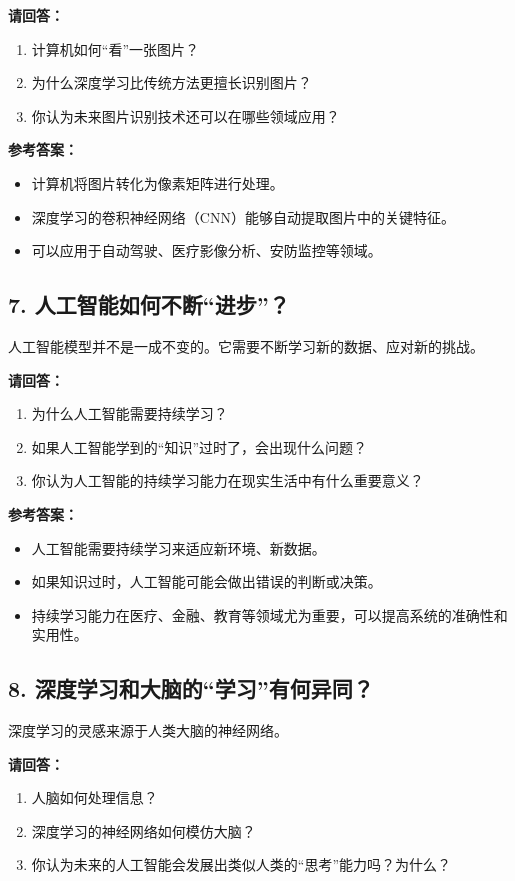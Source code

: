 \textbf{请回答：}
\begin{enumerate}
    \item 计算机如何“看”一张图片？
    \item 为什么深度学习比传统方法更擅长识别图片？
    \item 你认为未来图片识别技术还可以在哪些领域应用？
\end{enumerate}

\textbf{参考答案：}
\begin{itemize}
    \item 计算机将图片转化为像素矩阵进行处理。
    \item 深度学习的卷积神经网络（CNN）能够自动提取图片中的关键特征。
    \item 可以应用于自动驾驶、医疗影像分析、安防监控等领域。
\end{itemize}

\subsection*{7. 人工智能如何不断“进步”？}
人工智能模型并不是一成不变的。它需要不断学习新的数据、应对新的挑战。

\textbf{请回答：}
\begin{enumerate}
    \item 为什么人工智能需要持续学习？
    \item 如果人工智能学到的“知识”过时了，会出现什么问题？
    \item 你认为人工智能的持续学习能力在现实生活中有什么重要意义？
\end{enumerate}

\textbf{参考答案：}
\begin{itemize}
    \item 人工智能需要持续学习来适应新环境、新数据。
    \item 如果知识过时，人工智能可能会做出错误的判断或决策。
    \item 持续学习能力在医疗、金融、教育等领域尤为重要，可以提高系统的准确性和实用性。
\end{itemize}

\subsection*{8. 深度学习和大脑的“学习”有何异同？}
深度学习的灵感来源于人类大脑的神经网络。

\textbf{请回答：}
\begin{enumerate}
    \item 人脑如何处理信息？
    \item 深度学习的神经网络如何模仿大脑？
    \item 你认为未来的人工智能会发展出类似人类的“思考”能力吗？为什么？
\end{enumerate}


